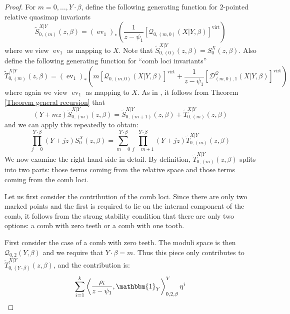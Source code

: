 \documentclass[10pt]{amsart}
\newcommand{\Q}[4]{\mathcal{Q}_{#1,#2}(#3,#4)}
\newcommand{\virt}[1]{[#1]^{\operatorname{virt}}}
\newcommand{\ev}{\operatorname{ev}}
\theoremstyle{definition}
\theoremstyle{definition}
\begin{document}
\begin{proof}
For $m = 0, \ldots, Y \cdot \beta$, define the following generating function for $2$-pointed relative quasimap invariants
 \[
  \widetilde{S}_{0,(m)}^{X|Y}(z,\beta)=(\ev_1)_*\left(\frac{1}{z-\psi_1}\virt{\Q{0}{(m,0)}{X|Y}{\beta}}\right)
 \]
where we view $\ev_1$ as mapping to $X$.  Note that  $\widetilde{S}_{0,(0)}^{X|Y}(z,\beta) = S_0^X(z, \beta)$. Also define the following generating function for ``comb loci invariants''
\[
 \widetilde{T}_{0,(m)}^{X|Y}(z,\beta)=(\ev_1)_*\left(m \virt{\Q{0}{(m,0)}{X|Y}{\beta}}+\frac{1}{z-\psi_1} \virt{\mathcal{D}^{\mathcal{Q}}_{(m,0),1}(X|Y,\beta)} \right)
\]
where again we view $\ev_1$ as mapping to $X$. As in \cite[Lemma 1.2]{Ga-MF}, it follows from Theorem \ref{Theorem general recursion} that
\begin{equation}\label{Gathmann recursion via generating functions}
 (Y+mz) \widetilde{S}_{0,(m)}^{X|Y}(z,\beta) = \widetilde{S}_{0,(m+1)}^{X|Y}(z,\beta)+ \widetilde{T}_{0,(m)}^{X|Y}(z,\beta)
\end{equation}
and we can apply this repeatedly to obtain:
\begin{equation} \label{eqn:G}
\prod_{j=0}^{Y\cdot\beta}(Y+jz) S_0^X(z,\beta) = \sum_{m=0}^{Y\cdot\beta}\prod_{j=m+1}^{Y\cdot\beta}(Y+jz)\widetilde{T}_{0,(m)}^{X|Y}(z,\beta)
\end{equation}
We now examine the right-hand side in detail. By definition, $\widetilde{T}_{0,(m)}^{X|Y}(z,\beta)$ splits into two parts: those terms coming from the relative space and those terms coming from the comb loci.

Let us first consider the contribution of the comb loci. Since there are only two marked points and the first is required to lie on the internal component of the comb, it follows from the strong stability condition that there are only two options: a comb with zero teeth or a comb with one tooth.

First consider the case of a comb with zero teeth. The moduli space is then $\Q{0}{2}{Y}{\beta}$ and we require that $Y \cdot \beta = m$. Thus this piece only contributes to $\widetilde{T}_{0,(Y\cdot\beta)}^{X|Y}(z,\beta)$, and the contribution is:
\begin{equation*} \sum_{i=1}^k \left\langle \dfrac{\rho_i}{z-\psi_1}, \mathbbm{1}_Y \right\rangle_{0,2,\beta}^Y \eta^i \end{equation*}


\end{proof}
\end{document}
